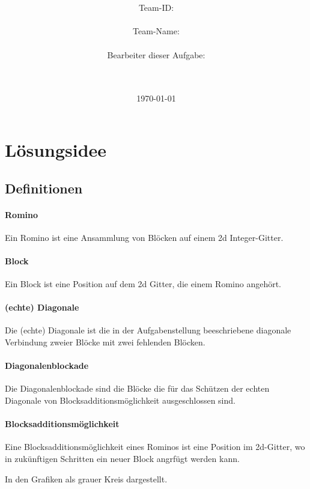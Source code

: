 \documentclass[a4paper,10pt,ngerman]{scrartcl}
\title{\textbf{\Huge\Aufgabe}}
\author{\LARGE Team-ID: \LARGE \TeamID \\\\
	    \LARGE Team-Name: \LARGE \TeamName \\\\
	    \LARGE Bearbeiter dieser Aufgabe: \\ 
	    \LARGE \Namen\\\\}
\date{\LARGE\today}
\begin{document}
\maketitle
\tableofcontents


\section{Lösungsidee}

\subsection{Definitionen}

\paragraph{Romino}

Ein Romino ist eine Ansammlung von Blöcken auf einem 2d Integer-Gitter.

\paragraph{Block}

Ein Block ist eine Position auf dem 2d Gitter, die einem Romino angehört.

\paragraph{(echte) Diagonale}

Die (echte) Diagonale ist die in der Aufgabenstellung beeschriebene diagonale Verbindung zweier Blöcke mit zwei fehlenden Blöcken. %

\paragraph{Diagonalenblockade}

Die Diagonalenblockade sind die Blöcke die für das Schützen der echten Diagonale von Blocksadditionsmöglichkeit ausgeschlossen sind.

\paragraph{Blocksadditionsmöglichkeit}

Eine Blocksadditionsmöglichkeit eines Rominos ist eine Position im 2d-Gitter, wo in zukünftigen Schritten ein neuer Block angrfügt werden kann.

In den Grafiken als grauer Kreis dargestellt.
\end{document}

